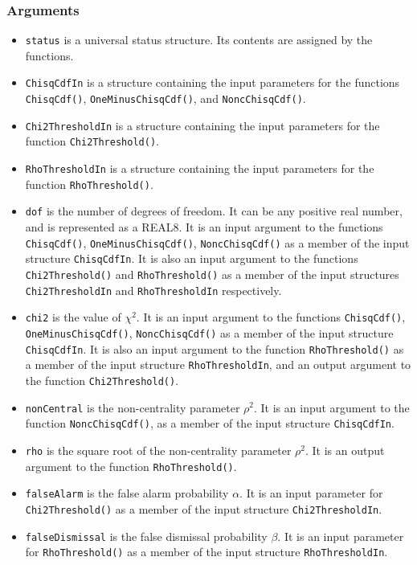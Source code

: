 \documentclass{article}
\begin{document}
\subsubsection{Arguments}


\begin{itemize}
\item \texttt{status} is a universal status structure.  Its contents are
assigned by the functions.
\item \texttt{ChisqCdfIn} is a structure containing the input
parameters for the functions \verb+ChisqCdf()+,
\verb+OneMinusChisqCdf()+, and \verb+NoncChisqCdf()+.
\item \texttt{Chi2ThresholdIn} is a structure containing the input
parameters for the function \verb+Chi2Threshold()+.
\item \texttt{RhoThresholdIn} is a structure containing the input
parameters for the function \verb+RhoThreshold()+.
\item \texttt{dof} is the number of degrees of freedom.  It can be any
positive real number, and is represented as a REAL8.  It is an input
argument to the functions \verb+ChisqCdf()+,
\verb+OneMinusChisqCdf()+, \verb+NoncChisqCdf()+ as a member of the
input structure \verb+ChisqCdfIn+.  It is also an input argument to
the functions \verb+Chi2Threshold()+ and \verb+RhoThreshold()+ as a
member of the input structures \verb+Chi2ThresholdIn+ and
\verb+RhoThresholdIn+ respectively.
\item \texttt{chi2} is the value of $\chi^2$.  It is an input
argument to the functions \verb+ChisqCdf()+,
\verb+OneMinusChisqCdf()+, \verb+NoncChisqCdf()+ as a member of the 
input structure \verb+ChisqCdfIn+.  It is also an input argument to
the function \verb+RhoThreshold()+ as a member of the input structure
\verb+RhoThresholdIn+, and an output argument to the function
\verb+Chi2Threshold()+. 
\item \texttt{nonCentral} is the non-centrality parameter $\rho^2$.
It is an input argument to the function \verb+NoncChisqCdf()+,
as a member of the input structure \verb+ChisqCdfIn+.  
\item \texttt{rho} is the square root of the non-centrality parameter
$\rho^2$.  It is an output argument to the function
\verb+RhoThreshold()+.
\item \texttt{falseAlarm} is the false alarm probability $\alpha$.  It
is an input parameter for \verb+Chi2Threshold()+ as a member of the
input structure \verb+Chi2ThresholdIn+.
\item \texttt{falseDismissal} is the false dismissal probability $\beta$.  It
is an input parameter for \verb+RhoThreshold()+ as a member of the
input structure \verb+RhoThresholdIn+.

\end{itemize}
\end{document}
